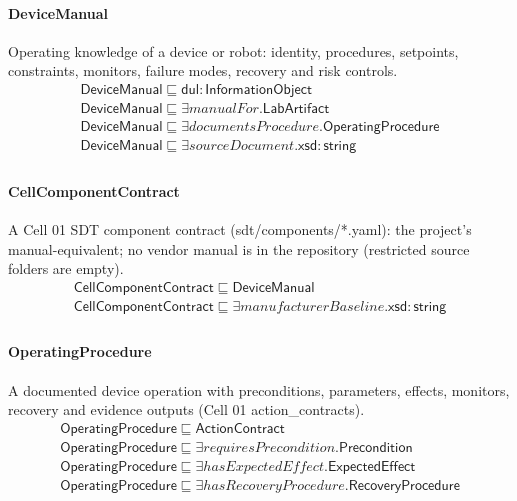 \documentclass[10pt]{article}
\begin{document}
\paragraph{DeviceManual} Operating knowledge of a device or robot: identity, procedures, setpoints, constraints, monitors, failure modes, recovery and risk controls.
\[\begin{array}{l}
\mathsf{DeviceManual} \sqsubseteq  \mathsf{dul{:}InformationObject} \\
\mathsf{DeviceManual} \sqsubseteq  \exists \mathit{manualFor}.\mathsf{LabArtifact} \\
\mathsf{DeviceManual} \sqsubseteq  \exists \mathit{documentsProcedure}.\mathsf{OperatingProcedure} \\
\mathsf{DeviceManual} \sqsubseteq  \exists \mathit{sourceDocument}.\mathsf{xsd{:}string} \\
\end{array}\]
\paragraph{CellComponentContract} A Cell 01 SDT component contract (sdt/components/*.yaml): the project's manual-equivalent; no vendor manual is in the repository (restricted source folders are empty).
\[\begin{array}{l}
\mathsf{CellComponentContract} \sqsubseteq  \mathsf{DeviceManual} \\
\mathsf{CellComponentContract} \sqsubseteq  \exists \mathit{manufacturerBaseline}.\mathsf{xsd{:}string} \\
\end{array}\]
\paragraph{OperatingProcedure} A documented device operation with preconditions, parameters, effects, monitors, recovery and evidence outputs (Cell 01 action\_contracts).
\[\begin{array}{l}
\mathsf{OperatingProcedure} \sqsubseteq  \mathsf{ActionContract} \\
\mathsf{OperatingProcedure} \sqsubseteq  \exists \mathit{requiresPrecondition}.\mathsf{Precondition} \\
\mathsf{OperatingProcedure} \sqsubseteq  \exists \mathit{hasExpectedEffect}.\mathsf{ExpectedEffect} \\
\mathsf{OperatingProcedure} \sqsubseteq  \exists \mathit{hasRecoveryProcedure}.\mathsf{RecoveryProcedure} \\
\end{array}\]
\end{document}
